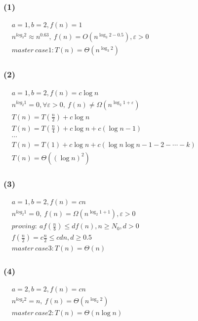 \documentclass[11pt]{ctexart}
\begin{document}
	\subsubsection*{(1)}
	$\begin{aligned}
	&a=1,b=2,f(n)=1\\
	&n^{log_3 2}\approx n^{0.63},\ f(n)=O(n^{\log_3 2-0.5}),\varepsilon >0 \\
	&master\ case1:T(n)=\Theta (n^{\log_3 2})
	\end{aligned}
	$
	\subsubsection*{(2)}
	$\begin{aligned}
	&a=1,b=2,f(n)=c\log n\\
	&n^{log_2 1}=0,\forall \varepsilon >0,\ f(n)\neq\Omega(n^{\log_2 1+\varepsilon})\\
	&T(n)=T(\frac{n}{2})+c\log n\\
	&T(n)=T(\frac{n}{4})+c\log n+c(\log n -1)\\
	&\cdots\\
	&T(n)=T(1)+c\log n +c(\log n \log n-1-2-\cdots-k)\\
	&T(n)=\Theta((\log n)^2)
	\end{aligned}
	$
	\subsubsection*{(3)}
	$\begin{aligned}
	&a=1,b=2,f(n)=cn\\
	&n^{log_2 1}=0,\ f(n)=\Omega(n^{\log_2 1+1}),\varepsilon >0 \\
	&proving:\ af(\frac{n}{b})\leq df(n), n\geq N_0,d>0\\
	&f(\frac{n}{2})=c\frac{n}{2}\leq cdn,d\geq0.5\\
	&master\ case3:T(n)=\Theta (n)
	\end{aligned}
	$
	\subsubsection*{(4)}
	$\begin{aligned}
	&a=2,b=2,f(n)=cn\\
	&n^{log_2 2}=n,\ f(n)=\Theta(n^{\log_2 2})\\
	&master\ case2:T(n)=\Theta (n{\log n})
	\end{aligned}
	$
\end{document}
